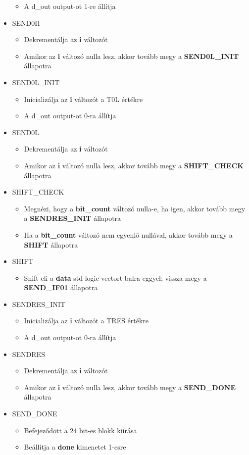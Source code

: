 \begin{itemize}
\begin{itemize}
	\item A d\_out output-ot 1-re állítja
	\end{itemize}
\item SEND0H
	\begin{itemize}
	\item Dekrementálja az \textbf{i} változót
	\item Amikor az \textbf{i} változó nulla lesz, akkor tovább megy a \textbf{SEND0L\_INIT} állapotra
	\end{itemize}
\item SEND0L\_INIT
	\begin{itemize}
	\item Inicializálja az \textbf{i} változót a T0L értékre
	\item A d\_out output-ot 0-ra állítja
	\end{itemize}
\item SEND0L
	\begin{itemize}
	\item Dekrementálja az \textbf{i} változót
	\item Amikor az \textbf{i} változó nulla lesz, akkor tovább megy a \textbf{SHIFT\_CHECK} állapotra
	\end{itemize}
\item SHIFT\_CHECK
	\begin{itemize}
	\item Megnézi, hogy a \textbf{bit\_count} változó nulla-e, ha igen, akkor tovább megy a \textbf{SENDRES\_INIT} állapotra
	\item Ha a \textbf{bit\_count} változó nem egyenlő nullával, akkor tovább megy a \textbf{SHIFT} állapotra
	\end{itemize}
\item SHIFT
	\begin{itemize}
	\item Shift-eli a \textbf{data} std logic vectort balra eggyel; vissza megy a \textbf{SEND\_IF01} állapotra
	\end{itemize}
\item SENDRES\_INIT
	\begin{itemize}
	\item Inicializálja az \textbf{i} változót a TRES értékre
	\item A d\_out output-ot 0-ra állítja
	\end{itemize}
\item SENDRES
	\begin{itemize}
	\item Dekrementálja az \textbf{i} változót
	\item Amikor az \textbf{i} változó nulla lesz, akkor tovább megy a \textbf{SEND\_DONE} állapotra
	\end{itemize}
\item SEND\_DONE
	\begin{itemize}
	\item Befejeződött a 24 bit-es blokk kiírása
	\item Beállítja a \textbf{done} kimenetet 1-esre
	\end{itemize}
\end{itemize}